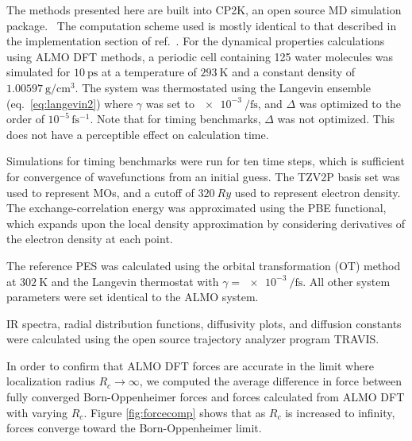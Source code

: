 \documentclass[aps,prl,reprint,amsmath,amssymb]{revtex4-1}
\begin{document}

The methods presented here are built into CP2K, an open source MD simulation package.~\cite{www:cp2k} 
The computation scheme used is mostly identical to that described in the implementation section of ref.\ . 
For the dynamical properties calculations using ALMO DFT methods, a periodic cell containing 125 water molecules was simulated for $\SI{10}{\ps}$ at a temperature of $\SI{293}{\K}$ and a constant density of $\SI{1.00597}{\g\per\cm^{3}}$. 
The system was thermostated using the Langevin ensemble (eq.\ \ref{eq:langevin2}) where $\gamma$ was set to $\SI{e-3}{\per\fs}$, and $\Delta$ was optimized to the order of $10^{-5}\, \mathrm{fs^{-1}}$. 
Note that for timing benchmarks, $\Delta$ was not optimized. 
This does not have a perceptible effect on calculation time.

Simulations for timing benchmarks were run for ten time steps, which is sufficient for convergence of wavefunctions from an initial guess.
The TZV2P basis set was used to represent MOs, and a cutoff of $\SI{320}{Ry}$ used to represent electron density. 
The exchange-correlation energy was approximated using the PBE functional, which expands upon the local density approximation by considering derivatives of the electron density at each point.~\cite{a:PBEfunctional} 

The reference PES was calculated using the orbital transformation (OT) method~\cite{a:ot,a:ot2} at $\SI{302}{\K}$ and the Langevin thermostat with $\gamma = \SI{e-3}{\per\fs}$. 
All other system parameters were set identical to the ALMO system.

IR spectra, radial distribution functions, diffusivity plots, and diffusion constants were calculated using the open source trajectory analyzer program TRAVIS.~\cite{a:travis-main,a:travis-ir1,a:travis-ir2}


In order to confirm that ALMO DFT forces are accurate in the limit where localization radius $R_{c} \rightarrow \infty$, we computed the average difference in force between fully converged Born-Oppenheimer forces and forces calculated from ALMO DFT with varying $R_{c}$. 
Figure \ref{fig:forcecomp} shows that as $R_{c}$ is increased to infinity, forces converge toward the Born-Oppenheimer limit.
\end{document}
